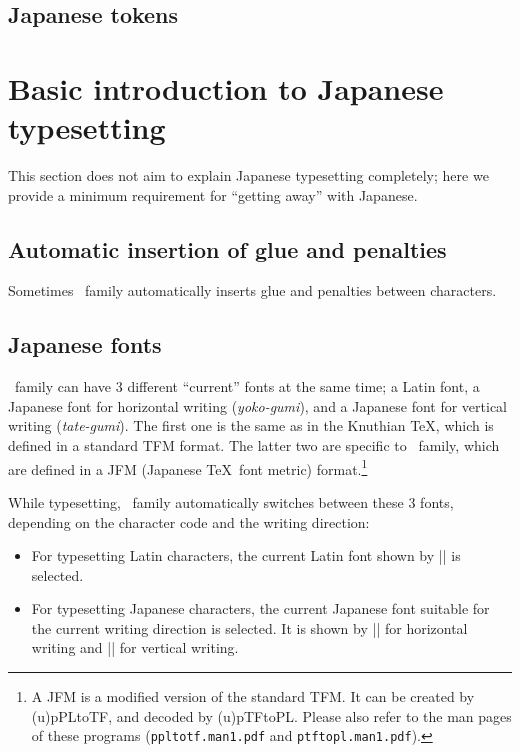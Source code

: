 \documentclass[a4paper,11pt,dvipdfmx]{article}
\def\code#1{\texttt{#1}}
\def\Foreign#1{\textit{#1}}
\begin{document}
\subsection{Japanese tokens}


\section{Basic introduction to Japanese typesetting}

This section does not aim to explain Japanese typesetting completely;
here we provide a minimum requirement for ``getting away'' with Japanese.

\subsection{Automatic insertion of glue and penalties}

Sometimes \pTeX\ family automatically inserts glue and penalties
between characters.

\subsection{Japanese fonts}

\pTeX\ family can have 3 different ``current'' fonts at the same time;
a Latin font, a Japanese font for horizontal writing (\Foreign{yoko-gumi}),
and a Japanese font for vertical writing (\Foreign{tate-gumi}).
The first one is the same as in the Knuthian \TeX,
which is defined in a standard TFM format.
The latter two are specific to \pTeX\ family, which are defined
in a JFM (Japanese \TeX\ font metric) format.\footnote{%
A JFM is a modified version of the standard TFM.
It can be created by (u)pPLtoTF, and decoded by (u)pTFtoPL.
Please also refer to the man pages of these programs
(\code{ppltotf.man1.pdf} and \code{ptftopl.man1.pdf}).}

While typesetting, \pTeX\ family automatically switches between
these 3 fonts, depending on the character code and the writing direction:
\begin{itemize}
  \item For typesetting Latin characters,
    the current Latin font shown by |\the\font| is selected.
  \item For typesetting Japanese characters,
    the current Japanese font suitable for the current writing direction
    is selected. It is shown by |\the\jfont| for horizontal writing
    and |\the\tfont| for vertical writing.
\end{itemize}
\end{document}
